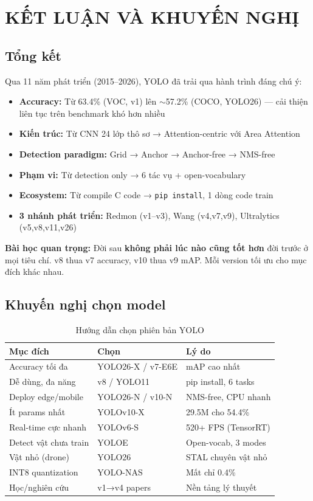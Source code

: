 \chapter{KẾT LUẬN VÀ KHUYẾN NGHỊ}

\section{Tổng kết}

Qua 11 năm phát triển (2015--2026), YOLO đã trải qua hành trình đáng chú ý:

\begin{itemize}
    \item \textbf{Accuracy:} Từ 63.4\% (VOC, v1) lên $\sim$57.2\% (COCO, YOLO26) — cải thiện liên tục trên benchmark khó hơn nhiều
    \item \textbf{Kiến trúc:} Từ CNN 24 lớp thô sơ → Attention-centric với Area Attention
    \item \textbf{Detection paradigm:} Grid → Anchor → Anchor-free → NMS-free
    \item \textbf{Phạm vi:} Từ detection only → 6 tác vụ + open-vocabulary
    \item \textbf{Ecosystem:} Từ compile C code → \texttt{pip install}, 1 dòng code train
    \item \textbf{3 nhánh phát triển:} Redmon (v1--v3), Wang (v4,v7,v9), Ultralytics (v5,v8,v11,v26)
\end{itemize}

\textbf{Bài học quan trọng:} Đời sau \textbf{không phải lúc nào cũng tốt hơn} đời trước ở mọi tiêu chí. v8 thua v7 accuracy, v10 thua v9 mAP. Mỗi version tối ưu cho mục đích khác nhau.

\section{Khuyến nghị chọn model}

\begin{table}[H]\centering
\caption{Hướng dẫn chọn phiên bản YOLO}
\begin{tabular}{lll}\toprule
\textbf{Mục đích} & \textbf{Chọn} & \textbf{Lý do}\\\midrule
Accuracy tối đa & YOLO26-X / v7-E6E & mAP cao nhất \\
Dễ dùng, đa năng & v8 / YOLO11 & pip install, 6 tasks \\
Deploy edge/mobile & YOLO26-N / v10-N & NMS-free, CPU nhanh \\
Ít params nhất & YOLOv10-X & 29.5M cho 54.4\% \\
Real-time cực nhanh & YOLOv6-S & 520+ FPS (TensorRT) \\
Detect vật chưa train & YOLOE & Open-vocab, 3 modes \\
Vật nhỏ (drone) & YOLO26 & STAL chuyên vật nhỏ \\
INT8 quantization & YOLO-NAS & Mất chỉ 0.4\% \\
Học/nghiên cứu & v1→v4 papers & Nền tảng lý thuyết \\
\bottomrule
\end{tabular}
\end{table}

